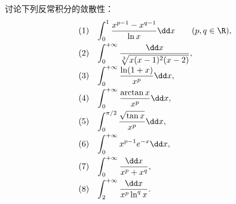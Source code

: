 \newpage

\begin{problem}
	讨论下列反常积分的敛散性：
	\[
	\begin{array}{ll}
		(1)&\displaystyle \int_0^{1}\frac{x^{p-1}-x^{q-1}}{\ln x}\dd x\qquad(p,q\in\R),\\[8pt]
		(2)&\displaystyle \int_0^{+\infty}\frac{\dd x}{\sqrt[3]{x(x-1)^2(x-2)}},\\[8pt]
		(3)&\displaystyle \int_0^{+\infty}\frac{\ln(1+x)}{x^p}\dd x,\\[8pt]
		(4)&\displaystyle \int_0^{+\infty}\frac{\arctan x}{x^p}\dd x,\\[8pt]
		(5)&\displaystyle \int_0^{\pi/2}\frac{\sqrt{\tan x}}{x^p}\dd x,\\[8pt]
		(6)&\displaystyle \int_0^{+\infty}x^{p-1}e^{-x}\dd x,\\[8pt]
		(7)&\displaystyle \int_0^{+\infty}\frac{\dd x}{x^p+x^q},\\[8pt]
		(8)&\displaystyle \int_2^{+\infty}\frac{\dd x}{x^p\ln^qx}.
	\end{array}
	\]
\end{problem}

